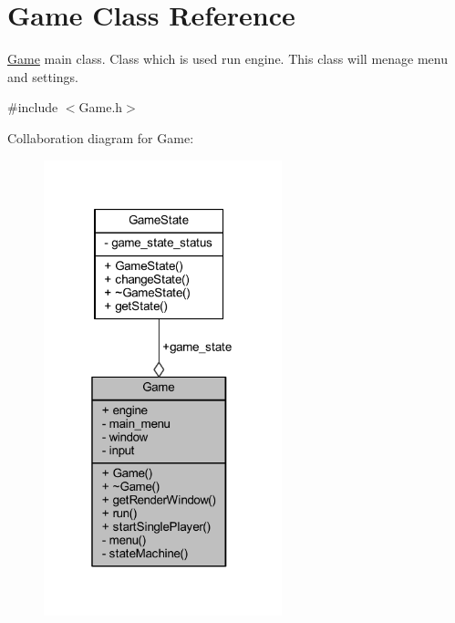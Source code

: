 \hypertarget{class_game}{}\section{Game Class Reference}
\label{class_game}


\hyperlink{class_game}{Game} main class. Class which is used run engine. This class will menage menu and settings.  




{\ttfamily \#include $<$Game.\+h$>$}



Collaboration diagram for Game\+:
\nopagebreak
\begin{figure}[H]
\begin{center}
\leavevmode
\includegraphics[width=196pt]{class_game__coll__graph}
\end{center}
\end{figure}
